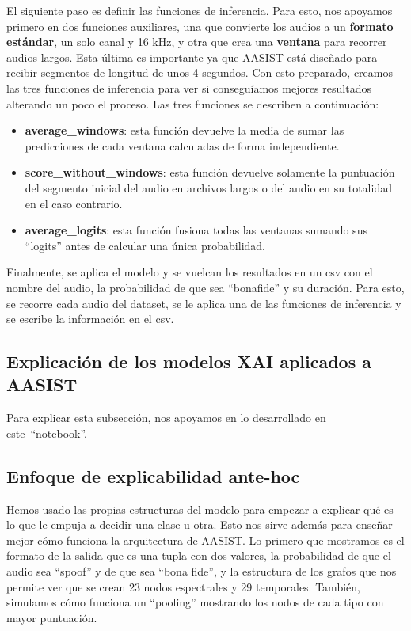 El siguiente paso es definir las funciones de inferencia. Para esto, nos apoyamos primero en dos funciones auxiliares, una que convierte los audios a un \textbf{formato estándar}, un solo canal y 16 kHz, y otra que crea una \textbf{ventana} para recorrer audios largos. Esta última es importante ya que AASIST está diseñado para recibir segmentos de longitud de unos 4 segundos.
Con esto preparado, creamos las tres funciones de inferencia para ver si conseguíamos mejores resultados alterando un poco el proceso. Las tres funciones se describen a continuación:
\begin{itemize}
    \item \textbf{average\_windows}: esta función devuelve la media de sumar las predicciones de cada ventana calculadas de forma independiente. 
    \item \textbf{score\_without\_windows}: esta función devuelve solamente la puntuación del segmento inicial del audio en archivos largos o del audio en su totalidad en el caso contrario.
    \item \textbf{average\_logits}: esta función fusiona todas las ventanas sumando sus ``logits'' antes de calcular una única probabilidad.
\end{itemize}
Finalmente, se aplica el modelo y se vuelcan los resultados en un csv con el nombre del audio, la probabilidad de que sea ``bonafide'' y su duración. Para esto, se recorre cada audio del dataset, se le aplica una de las funciones de inferencia y se escribe la información en el csv.

\subsection*{Explicación de los modelos XAI aplicados a AASIST}
Para explicar esta subsección, nos apoyamos en lo desarrollado en este~``\href{https://github.com/NILGroup/tfg-2526-xplicavoz/blob/main/Modelos/German/AASIST_XAI_declaracion.ipynb}{notebook}''.
\subsection*{Enfoque de explicabilidad ante-hoc}
Hemos usado las propias estructuras del modelo para empezar a explicar qué es lo que le empuja a decidir una clase u otra. Esto nos sirve además para enseñar mejor cómo funciona la arquitectura de AASIST.
Lo primero que mostramos es el formato de la salida que es una tupla con dos valores, la probabilidad de que el audio sea ``spoof'' y de que sea ``bona fide'', y la estructura de los grafos que nos permite ver que se crean 23 nodos espectrales y 29 temporales. También, simulamos cómo funciona un ``pooling'' mostrando los nodos de cada tipo con mayor puntuación.

